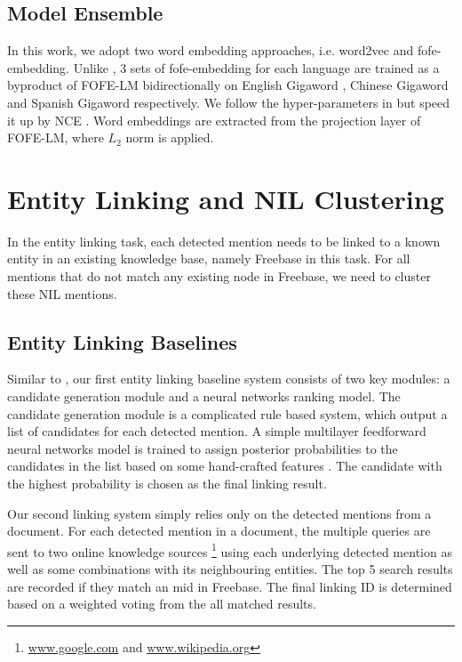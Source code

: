 \documentclass[11pt]{article}
\begin{document}
\subsection{Model Ensemble}

In this work, we adopt two word embedding approaches, i.e. word2vec \cite{mikolov2013distributed} and fofe-embedding. 
Unlike \cite{joseph2017embed}, 3 sets of fofe-embedding for each language are trained as a byproduct of FOFE-LM \cite{zhang2015fixed,zhang2015arxiv} bidirectionally on English Gigaword \cite{parker2011english}, Chinese Gigaword \cite{graff2005chinese} and Spanish Gigaword \cite{mendonca2009spanish} respectively. 
We follow the hyper-parameters in \cite{zhang2015fixed,zhang2015arxiv} but speed it up by NCE \cite{gutmann2010noise}. Word embeddings are extracted from the projection layer of FOFE-LM, where $L_2$ norm is applied. 

\section{Entity Linking and NIL Clustering}

In the entity linking task, each detected mention needs to be linked to a known entity in an existing
knowledge base, namely Freebase in this task. For all mentions that do not match any existing node in Freebase, we need to cluster these NIL mentions.

\subsection{Entity Linking Baselines}

Similar to \cite{kbp2016iflytek}, our first entity linking baseline system consists of two key modules: a candidate generation module and a neural networks ranking model. The candidate generation module is a complicated rule based system, which output a list of candidates for each detected mention. A simple multilayer feedforward neural networks model is trained to assign posterior probabilities to the candidates in the list based on some hand-crafted features \cite{kbp2016iflytek}. The candidate with the highest probability is chosen as the final linking result. 

Our second linking system simply relies only on the detected mentions from a document. For each detected mention in a document, the multiple queries are sent to two online knowledge sources \footnote{\url{www.google.com} and \url{www.wikipedia.org}} using each underlying detected mention as well as some combinations with its neighbouring entities. The top 5 search results are recorded if they match an mid in Freebase. The final linking ID is determined based on a weighted voting from the all matched results.
\end{document}
